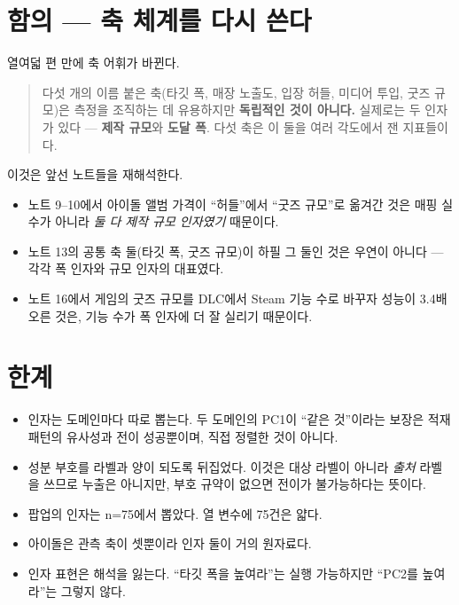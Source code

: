 \documentclass[10pt]{article}
\begin{document}

\section{함의 --- 축 체계를 다시 쓴다}

열여덟 편 만에 축 어휘가 바뀐다.

\begin{quote}\fontsize{9.5}{11.5}\selectfont
다섯 개의 이름 붙은 축(타깃 폭, 매장 노출도, 입장 허들, 미디어 투입, 굿즈 규모)은
측정을 조직하는 데 유용하지만 \textbf{독립적인 것이 아니다.} 실제로는 두 인자가
있다 --- \textbf{제작 규모}와 \textbf{도달 폭}. 다섯 축은 이 둘을 여러 각도에서
잰 지표들이다.
\end{quote}

이것은 앞선 노트들을 재해석한다.

\begin{itemize}[leftmargin=1.1em,itemsep=0.15em]
\item 노트 9--10에서 아이돌 앨범 가격이 ``허들''에서 ``굿즈 규모''로 옮겨간 것은
      매핑 실수가 아니라 \emph{둘 다 제작 규모 인자였기} 때문이다.
\item 노트 13의 공통 축 둘(타깃 폭, 굿즈 규모)이 하필 그 둘인 것은 우연이 아니다 ---
      각각 폭 인자와 규모 인자의 대표였다.
\item 노트 16에서 게임의 굿즈 규모를 DLC에서 Steam 기능 수로 바꾸자 성능이
      3.4배 오른 것은, 기능 수가 폭 인자에 더 잘 실리기 때문이다.
\end{itemize}

\section{한계}

\begin{itemize}[leftmargin=1.1em,itemsep=0.15em]
\item 인자는 도메인마다 따로 뽑는다. 두 도메인의 PC1이 ``같은 것''이라는 보장은
      적재 패턴의 유사성과 전이 성공뿐이며, 직접 정렬한 것이 아니다.
\item 성분 부호를 라벨과 양이 되도록 뒤집었다. 이것은 대상 라벨이 아니라 \emph{출처}
      라벨을 쓰므로 누출은 아니지만, 부호 규약이 없으면 전이가 불가능하다는 뜻이다.
\item 팝업의 인자는 n=75에서 뽑았다. 열 변수에 75건은 얇다.
\item 아이돌은 관측 축이 셋뿐이라 인자 둘이 거의 원자료다.
\item 인자 표현은 해석을 잃는다. ``타깃 폭을 높여라''는 실행 가능하지만
      ``PC2를 높여라''는 그렇지 않다.
\end{itemize}
\end{document}

